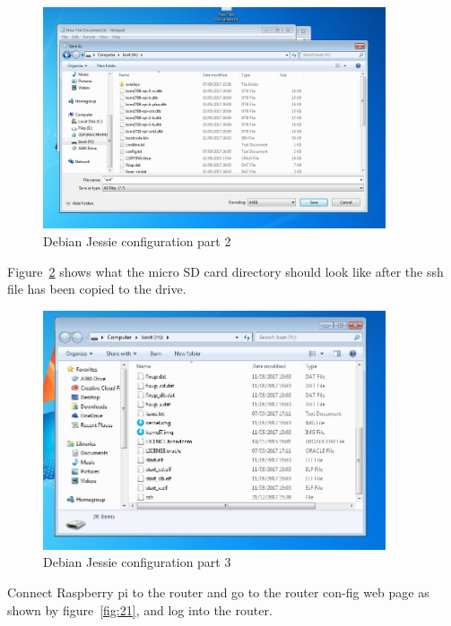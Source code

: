 \documentclass[12pt,]{article}
\begin{document}
\begin{figure}[H]
  	\begin{center}
    	\includegraphics[width=0.9\textwidth]{Ras_1,2}
  	\end{center}
  	\caption{Debian Jessie configuration part 2}
	\label{fig:18}
\end{figure}
Figure~\ref{fig:19} shows what the micro SD card directory should look like after the ssh file has been copied to the drive.
\begin{figure}[H]
  	\begin{center}
    	\includegraphics[width=0.9\textwidth]{Ras_1,3}
  	\end{center}
  	\caption{Debian Jessie configuration part 3}
	\label{fig:19}
\end{figure}
Connect Raspberry pi to the router and go to the router con-fig web page as shown by figure~\ref{fig:21}, and log into the router.
\end{document}
